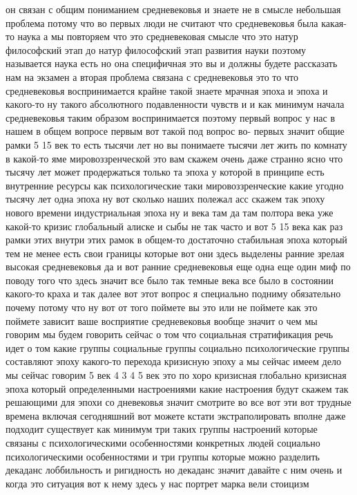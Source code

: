 он связан с общим пониманием средневековья и знаете не в смысле небольшая
проблема потому что во первых люди не считают что средневековья была какая-то
наука а мы повторяем что это средневековая смысле что это натур философский этап
до натур философский этап развития науки поэтому называется наука есть но она
специфичная это вы и должны будете рассказать нам на экзамен а вторая проблема
связана с средневековья это то что средневековья воспринимается крайне такой
знаете мрачная эпоха и эпоха и какого-то ну такого абсолютного подавленности
чувств и и как минимум начала средневековья таким образом воспринимается поэтому
первый вопрос у нас в нашем в общем вопросе первым вот такой под вопрос во-
первых значит общие рамки 5 15 век то есть тысячи лет но вы понимаете тысячи лет
жить по комнату в какой-то яме мировоззренческой это вам скажем очень даже
странно ясно что тысячу лет может продержаться только та эпоха у которой в
принципе есть внутренние ресурсы как психологические таки мировоззренческие
какие угодно тысячу лет одна эпоха ну вот сколько наших полежал асс скажем так
эпоху нового времени индустриальная эпоха ну и века там да там полтора века уже
какой-то кризис глобальный алиске и сыбы не так часто и вот 5 15 века как раз
рамки этих внутри этих рамок в общем-то достаточно стабильная эпоха который тем
не менее есть свои границы которые вот они здесь выделены ранние зрелая высокая
средневековья да и вот ранние средневековья еще одна еще один миф по поводу того
что здесь значит все было так темные века все было в состоянии какого-то краха и
так далее вот этот вопрос я специально подниму обязательно почему потому что ну
вот от того поймете вы это или не поймете как это поймете зависит ваше
восприятие средневековья вообще значит о чем мы говорим мы будем говорить сейчас
о том что социальная стратификация речь идет о том какие группы социальные
группы социально психологические группы составляют эпоху какого-то перехода
кризисную эпоху а мы сейчас имеем дело мы сейчас говорим 5 век 4 3 4 5 век это
по хоро кризисная глобально кризисная эпоха который определенными настроениями
какие настроения будут скажем так решающими для эпохи со дневековья значит
смотрите во все вот эти вот трудные времена включая сегодняшний вот можете
кстати экстраполировать вполне даже подходит существует как минимум три таких
группы настроений которые связаны с психологическими особенностями конкретных
людей социально психологическими особенностями и три группы которые можно
разделить декаданс лоббильность и ригидность но декаданс значит давайте с ним
очень и когда это ситуация вот к нему здесь у нас портрет марка вели стоицизм
